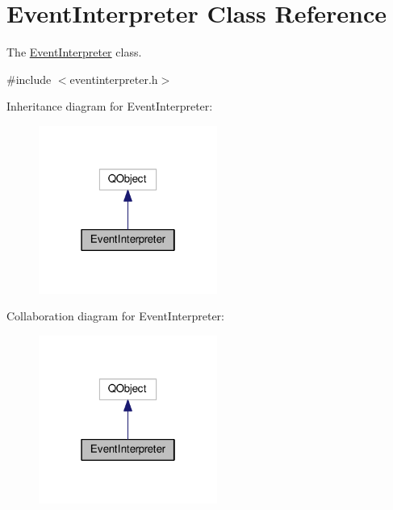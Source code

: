 \hypertarget{classEventInterpreter}{\section{Event\-Interpreter Class Reference}
\label{classEventInterpreter}
}


The \hyperlink{classEventInterpreter}{Event\-Interpreter} class.  




{\ttfamily \#include $<$eventinterpreter.\-h$>$}



Inheritance diagram for Event\-Interpreter\-:
\nopagebreak
\begin{figure}[H]
\begin{center}
\leavevmode
\includegraphics[width=166pt]{classEventInterpreter__inherit__graph}
\end{center}
\end{figure}


Collaboration diagram for Event\-Interpreter\-:
\nopagebreak
\begin{figure}[H]
\begin{center}
\leavevmode
\includegraphics[width=166pt]{classEventInterpreter__coll__graph}
\end{center}
\end{figure}
